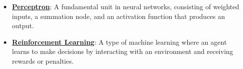 \documentclass{article}%
\begin{document}
\begin{itemize}[leftmargin=*]
\item \href{https://purdue.brightspace.com/d2l/common/assets/pdfjs-d2l-dist/1.0.14-legacy/web/viewer.html?file=\%2Fcontent\%2Fenforced\%2F1095467-wl.202510.CS.24300.001\%2F02L2-Intro.pdf\%3Fou\%3D1095467\&lang=en-us\&container=d2l-fileviewer-rendered-pdf\&fullscreen=d2l-fileviewer-rendered-pdf-dialog\&height=667#page=45}{\textbf{Perceptron}}: A fundamental unit in neural networks, consisting of weighted inputs, a summation node, and an activation function that produces an output.%
\item \href{https://purdue.brightspace.com/d2l/common/assets/pdfjs-d2l-dist/1.0.14-legacy/web/viewer.html?file=\%2Fcontent\%2Fenforced\%2F1095467-wl.202510.CS.24300.001\%2F02L2-Intro.pdf\%3Fou\%3D1095467\&lang=en-us\&container=d2l-fileviewer-rendered-pdf\&fullscreen=d2l-fileviewer-rendered-pdf-dialog\&height=667#page=46}{\textbf{Reinforcement Learning}}: A type of machine learning where an agent learns to make decisions by interacting with an environment and receiving rewards or penalties.%
\end{itemize}%
\end{document}
